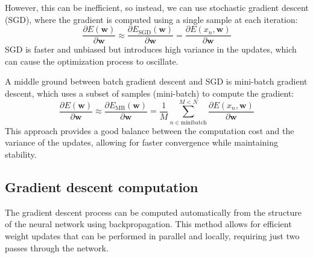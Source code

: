 However, this can be inefficient, so instead, we can use stochastic gradient descent (SGD), where the gradient is computed using a single sample at each iteration:
\[\dfrac{\partial E(\mathbf{w})}{\partial \mathbf{w}}\approx\dfrac{\partial E_{\text{SGD}}(\mathbf{w})}{\partial \mathbf{w}}=\dfrac{\partial E(x_n,\mathbf{w})}{\partial\mathbf{w}}\]
SGD is faster and unbiased but introduces high variance in the updates, which can cause the optimization process to oscillate.

A middle ground between batch gradient descent and SGD is mini-batch gradient descent, which uses a subset of samples (mini-batch) to compute the gradient:
\[\dfrac{\partial E(\mathbf{w})}{\partial \mathbf{w}}\approx\dfrac{\partial E_{\text{MB}}(\mathbf{w})}{\partial \mathbf{w}}=\dfrac{1}{M}\sum_{n\in\text{minibatch}}^{M<N}\dfrac{\partial E(x_n,\mathbf{w})}{\partial\mathbf{w}}\]
This approach provides a good balance between the computation cost and the variance of the updates, allowing for faster convergence while maintaining stability.

\subsection{Gradient descent computation}
The gradient descent process can be computed automatically from the structure of the neural network using backpropagation.
This method allows for efficient weight updates that can be performed in parallel and locally, requiring just two passes through the network.




